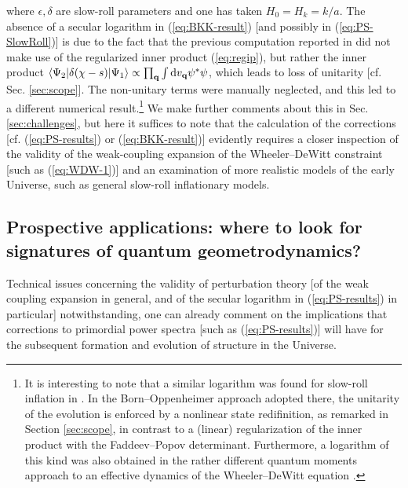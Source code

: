 \documentclass[12pt]{iopart}
\def\eref#1{(\ref{eq:#1})}
\def\D{\mathrm{d}}
\def\q{\mathbf{q}}
\begin{document}
where $\epsilon,\delta$ are slow-roll parameters and one has taken $H_0 = H_k = k/a$. The absence of a secular logarithm in \eref{BKK-result} [and possibly in \eref{PS-SlowRoll}] is due to the fact that the previous computation reported in \citet{Brizuela:2015tzl,Brizuela:2016gnz,Brizuela:2019jzv} did not make use of the regularized inner product \eref{regip}, but rather the inner product $\braket{\Psi_2|\delta(\chi-s)|\Psi_1} \propto \prod_{\q}\int\D v_{\q}\psi^*\psi$, which leads to loss of unitarity [cf. Sec. \ref{sec:scope}]. The non-unitary terms were manually neglected, and this led to a different numerical result.\footnote{It is interesting to note that a similar logarithm was found for slow-roll inflation in \citet{KTV3}. In the Born--Oppenheimer approach adopted there, the unitarity of the evolution is enforced by a nonlinear state redifinition, as remarked in Section \ref{sec:scope}, in contrast to a (linear) regularization of the inner product with the Faddeev--Popov determinant. Furthermore, a logarithm of this kind was also obtained in the rather different quantum moments approach to an effective dynamics of the Wheeler--DeWitt equation \citep{Brizuela:moment}.} We make further comments about this in Sec. \ref{sec:challenges}, but here it suffices to note that the calculation of the corrections [cf. \eref{PS-results} or \eref{BKK-result}] evidently requires a closer inspection of the validity of the weak-coupling expansion of the Wheeler--DeWitt constraint [such as \eref{WDW-1}] and an examination of more realistic models of the early Universe, such as general slow-roll inflationary models.

\subsection{\label{sec:signatures}Prospective applications: where to look for signatures of quantum geometrodynamics?}
Technical issues concerning the validity of perturbation theory [of the weak coupling expansion in general, and of the secular logarithm in \eref{PS-results} in particular] notwithstanding, one can already comment on the implications that corrections to primordial power spectra [such as \eref{PS-results}] will have for the subsequent formation and evolution of structure in the Universe.
\end{document}
